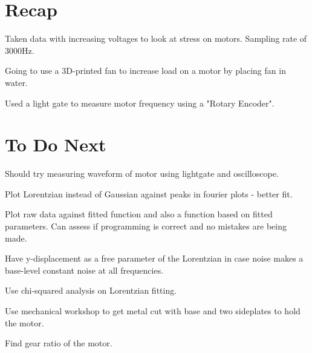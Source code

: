 \documentclass[11pt]{meetingmins}
\begin{document}
\maketitle


\section{Recap}
\begin{items}
\item
Taken data with increasing voltages to look at stress on motors. Sampling rate of 3000Hz.

\item
Going to use a 3D-printed fan to increase load on a motor by placing fan in water.

\item
Used a light gate to measure motor frequency using a "Rotary Encoder".
\end{items}

\section{To Do Next}
\begin{items}
\item
Should try measuring waveform of motor using lightgate and oscilloscope.

\item
Plot Lorentzian instead of Gaussian against peaks in fourier plots - better fit.

\item
Plot raw data against fitted function and also a function based on fitted parameters. Can assess if programming is correct and no mistakes are being made.

\item
Have y-displacement as a free parameter of the Lorentzian in case noise makes a base-level constant noise at all frequencies.

\item
Use chi-squared analysis on Lorentzian fitting.

\item
Use mechanical workshop to get metal cut with base and two sideplates to hold the motor.

\item
Find gear ratio of the motor.


\end{items}
\end{document}
